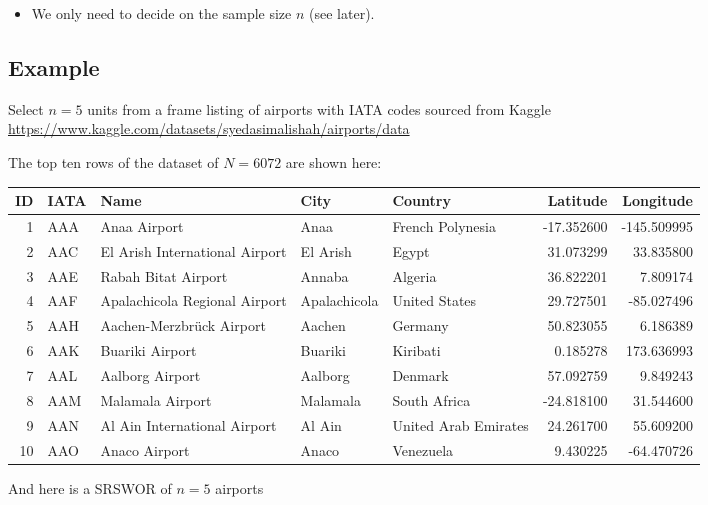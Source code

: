 \documentclass[
]{book}
\providecommand{\tightlist}{%
  \setlength{\itemsep}{0pt}\setlength{\parskip}{0pt}}
\begin{document}
\begin{itemize}
\tightlist
\item
  We only need to decide on the sample size \(n\) (see later).
\end{itemize}

\subsection*{Example}\label{example-1}

Select \(n=5\) units from a frame listing of airports with IATA codes
sourced from Kaggle \url{https://www.kaggle.com/datasets/syedasimalishah/airports/data}

The top ten rows of the dataset of \(N=6072\) are shown here:

\begin{table}
\centering
\begin{tabular}[t]{r|l|l|l|l|r|r}
\hline
ID & IATA & Name & City & Country & Latitude & Longitude\\
\hline
1 & AAA & Anaa Airport & Anaa & French Polynesia & -17.352600 & -145.509995\\
\hline
2 & AAC & El Arish International Airport & El Arish & Egypt & 31.073299 & 33.835800\\
\hline
3 & AAE & Rabah Bitat Airport & Annaba & Algeria & 36.822201 & 7.809174\\
\hline
4 & AAF & Apalachicola Regional Airport & Apalachicola & United States & 29.727501 & -85.027496\\
\hline
5 & AAH & Aachen-Merzbrück Airport & Aachen & Germany & 50.823055 & 6.186389\\
\hline
6 & AAK & Buariki Airport & Buariki & Kiribati & 0.185278 & 173.636993\\
\hline
7 & AAL & Aalborg Airport & Aalborg & Denmark & 57.092759 & 9.849243\\
\hline
8 & AAM & Malamala Airport & Malamala & South Africa & -24.818100 & 31.544600\\
\hline
9 & AAN & Al Ain International Airport & Al Ain & United Arab Emirates & 24.261700 & 55.609200\\
\hline
10 & AAO & Anaco Airport & Anaco & Venezuela & 9.430225 & -64.470726\\
\hline
\end{tabular}
\end{table}

And here is a SRSWOR of \(n=5\) airports
\end{document}
